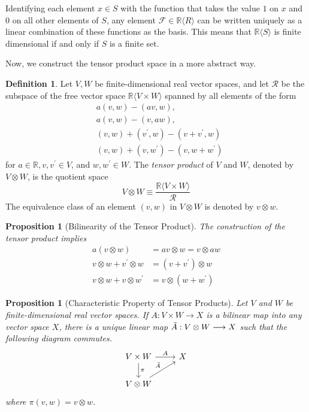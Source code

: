 \documentclass{article}
\newtheorem{proposition}[theorem]{Proposition}
\theoremstyle{remark}
\theoremstyle{definition}
\newtheorem{definition}{Definition}[section]
\begin{document}
Identifying each element $x \in S$ with the function that takes the value $1$ on $x$ and $0$ on all other elements of $S$, any element $\mathcal{F} \in \mathbb{R} \langle R \rangle$ can be written uniquely as a linear combination of these functions as the basis. This means that $\mathbb{R} \langle S \rangle$ is finite dimensional if and only if $S$ is a finite set. 

Now, we construct the tensor product space in a more abstract way. 
\begin{definition}
Let $V, W$ be finite-dimensional real vector spaces, and let $\mathcal{R}$ be the subspace of the free vector space $\mathbb{R} \langle V \times W \rangle$ spanned by all elements of the form 
\begin{align*}
    &a (v, w) - (a v, w), \\
    &a (v, w) - (v, a w), \\
    &(v, w) + (v^\prime, w) - (v + v^\prime, w) \\
    &(v, w) + (v, w^\prime) - (v, w + w^\prime) 
\end{align*}
for $a \in \mathbb{R}, v, v^\prime \in V$, and $w, w^\prime \in W$. The \textit{tensor product} of $V$ and $W$, denoted by $V \otimes W$, is the quotient space 
\[V \otimes W \equiv \frac{\mathbb{R} \langle V \times W \rangle}{\mathcal{R}}\]
The equivalence class of an element $(v, w)$ in $V \otimes W$ is denoted by $v \otimes w$. 
\end{definition}

\begin{proposition}[Bilinearity of the Tensor Product]
The construction of the tensor product implies 
\begin{align*}
    a (v \otimes w) & = av \otimes w = v \otimes a w \\
    v \otimes w + v^\prime \otimes w & = (v + v^\prime) \otimes w \\
    v \otimes w + v \otimes w^\prime & = v \otimes (w + w^\prime) 
\end{align*}
\end{proposition}

\begin{proposition}[Characteristic Property of Tensor Products]
Let $V$ and $W$ be finite-dimensional real vector spaces. If $A: V \times W \longrightarrow X$ is a bilinear map into any vector space $X$, there is a unique linear map $\Tilde{A}: V \otimes W \longrightarrow X$ such that the following diagram commutes. 
\[\begin{tikzcd}
V \times W \arrow{r}{A} \arrow{d}{\pi} & X \\
V \otimes W \arrow{ru}{\Tilde{A}}
\end{tikzcd}\]
where $\pi(v, w) = v \otimes w$. 
\end{proposition}
\end{document}
